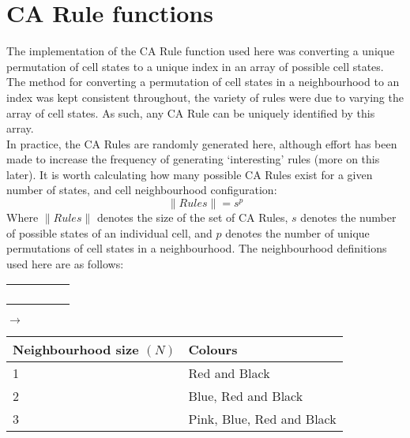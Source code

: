 \documentclass{article}
\begin{document}
	\section{CA Rule functions}
	
	The implementation of the CA Rule function used here was converting a unique permutation of cell states to a unique index in an array of possible cell states. The method for converting a permutation of cell states in a neighbourhood to an index was kept consistent throughout, the variety of rules were due to varying the array of cell states. As such, any CA Rule can be uniquely identified by this array.\\
	
	In practice, the CA Rules are randomly generated here, although effort has been made to increase the frequency of generating `interesting' rules (more on this later). It is worth calculating how many possible CA Rules exist for a given number of states, and cell neighbourhood configuration:
	\begin{equation}
		\|Rules\| = s^p
	\end{equation}
	Where $\|Rules\|$ denotes the size of the set of CA Rules, $s$ denotes the number of possible states of an individual cell, and $p$ denotes the number of unique permutations of cell states in a neighbourhood. The neighbourhood definitions used here are as follows:\\
	\newline
	\begin{tabular}{ | l| l | c | r |r|}
		\hline
		&\cellcolor{white}& \cellcolor{pink} &\cellcolor{white} & \\ \hline
		&\cellcolor{blue}& \cellcolor{red} &\cellcolor{blue} & \\ \hline
		\cellcolor{pink}&\cellcolor{red}& \cellcolor{black} &\cellcolor{red} &\cellcolor{pink} \\ \hline
		&\cellcolor{blue}& \cellcolor{red} &\cellcolor{blue} & \\ \hline
		&\cellcolor{white}& \cellcolor{pink} &\cellcolor{white}&  \\
		\hline
	\end{tabular}
	$\rightarrow$
	\begin{tabular}{|l|l|}
		\hline
		Neighbourhood size $(N)$& Colours\\ \hline
		1& Red and Black \\ \hline
		2& Blue, Red and Black\\ \hline
		3& Pink, Blue, Red and Black\\ \hline
	\end{tabular}\\
	
\end{document}
